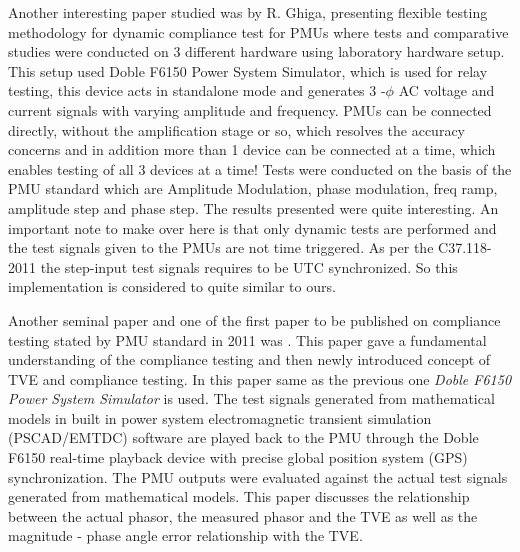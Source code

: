 Another interesting paper studied was by R. Ghiga, presenting flexible testing methodology for dynamic compliance test for PMUs \cite{Paper:ghiga} where tests and comparative studies were conducted on 3 different hardware  using laboratory hardware setup. This setup used Doble F6150 Power System Simulator, which is used for relay testing, this device acts in standalone mode and generates 3 -$\phi$ AC voltage and current signals with varying amplitude and frequency. PMUs can be connected directly, without the amplification stage or so, which resolves the accuracy concerns and in addition more than 1 device can be connected at a time, which enables testing of all 3 devices at a time! Tests were conducted on the basis of the PMU standard which are Amplitude Modulation, phase modulation, freq ramp, amplitude step and phase step. The results presented were quite interesting. An important note to make over here is that only dynamic tests are performed and the test signals given to the PMUs are not time triggered. As per the C37.118-2011 the step-input test signals requires to be UTC synchronized. So this implementation is considered to quite similar to ours.

Another seminal paper and one of the first paper to be published on compliance testing stated by PMU standard in 2011 was \cite{paper:nrendra}. This paper gave a fundamental understanding of the compliance testing and then newly introduced concept of TVE and compliance testing. In this paper same as the previous one \emph{Doble F6150 Power System Simulator} is used.  The test signals generated from mathematical models in built in power system electromagnetic transient simulation (PSCAD/EMTDC) software are played back to the PMU through the Doble F6150 real-time playback device with precise global position system (GPS) synchronization. The PMU outputs were evaluated against the actual test signals generated from mathematical models. This paper discusses the relationship between the actual phasor, the measured phasor and the TVE as well as the magnitude - phase angle error relationship with the TVE.

